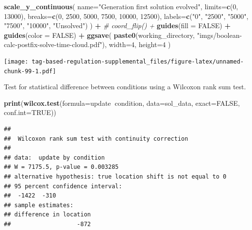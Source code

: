 \documentclass[]{book}
\newenvironment{Shaded}{\begin{snugshade}}{\end{snugshade}}
\newcommand{\CommentTok}[1]{\textcolor[rgb]{0.56,0.35,0.01}{\textit{#1}}}
\newcommand{\DataTypeTok}[1]{\textcolor[rgb]{0.13,0.29,0.53}{#1}}
\newcommand{\DecValTok}[1]{\textcolor[rgb]{0.00,0.00,0.81}{#1}}
\newcommand{\KeywordTok}[1]{\textcolor[rgb]{0.13,0.29,0.53}{\textbf{#1}}}
\newcommand{\NormalTok}[1]{#1}
\newcommand{\OperatorTok}[1]{\textcolor[rgb]{0.81,0.36,0.00}{\textbf{#1}}}
\newcommand{\OtherTok}[1]{\textcolor[rgb]{0.56,0.35,0.01}{#1}}
\newcommand{\StringTok}[1]{\textcolor[rgb]{0.31,0.60,0.02}{#1}}
\begin{document}
\begin{Shaded}
\begin{Highlighting}[]
\StringTok{  }\KeywordTok{scale_y_continuous}\NormalTok{(}
    \DataTypeTok{name=}\StringTok{"Generation first solution evolved"}\NormalTok{,}
    \DataTypeTok{limits=}\KeywordTok{c}\NormalTok{(}\DecValTok{0}\NormalTok{, }\DecValTok{13000}\NormalTok{),}
    \DataTypeTok{breaks=}\KeywordTok{c}\NormalTok{(}\DecValTok{0}\NormalTok{, }\DecValTok{2500}\NormalTok{, }\DecValTok{5000}\NormalTok{, }\DecValTok{7500}\NormalTok{, }\DecValTok{10000}\NormalTok{, }\DecValTok{12500}\NormalTok{),}
    \DataTypeTok{labels=}\KeywordTok{c}\NormalTok{(}\StringTok{"0"}\NormalTok{, }\StringTok{"2500"}\NormalTok{, }\StringTok{"5000"}\NormalTok{, }\StringTok{"7500"}\NormalTok{, }\StringTok{"10000"}\NormalTok{, }\StringTok{"Unsolved"}\NormalTok{)}
\NormalTok{  ) }\OperatorTok{+}
\StringTok{  }\CommentTok{# coord_flip() +}
\StringTok{  }\KeywordTok{guides}\NormalTok{(}\DataTypeTok{fill =} \OtherTok{FALSE}\NormalTok{) }\OperatorTok{+}
\StringTok{  }\KeywordTok{guides}\NormalTok{(}\DataTypeTok{color =} \OtherTok{FALSE}\NormalTok{) }\OperatorTok{+}
\StringTok{  }\KeywordTok{ggsave}\NormalTok{(}
    \KeywordTok{paste0}\NormalTok{(working_directory, }\StringTok{"imgs/boolean-calc-postfix-solve-time-cloud.pdf"}\NormalTok{),}
    \DataTypeTok{width=}\DecValTok{4}\NormalTok{,}
    \DataTypeTok{height=}\DecValTok{4}
\NormalTok{  )}
\end{Highlighting}
\end{Shaded}

\texttt{[image: tag-based-regulation-supplemental\_files/figure-latex/unnamed-chunk-99-1.pdf]}

Test for statistical difference between conditions using a Wilcoxon rank sum test.

\begin{Shaded}
\begin{Highlighting}[]
\KeywordTok{print}\NormalTok{(}\KeywordTok{wilcox.test}\NormalTok{(}\DataTypeTok{formula=}\NormalTok{update}\OperatorTok{~}\NormalTok{condition, }\DataTypeTok{data=}\NormalTok{sol_data, }\DataTypeTok{exact=}\OtherTok{FALSE}\NormalTok{, }\DataTypeTok{conf.int=}\OtherTok{TRUE}\NormalTok{))}
\end{Highlighting}
\end{Shaded}

\begin{verbatim}
## 
##  Wilcoxon rank sum test with continuity correction
## 
## data:  update by condition
## W = 7175.5, p-value = 0.003285
## alternative hypothesis: true location shift is not equal to 0
## 95 percent confidence interval:
##  -1422  -310
## sample estimates:
## difference in location 
##                   -872
\end{verbatim}
\end{document}
